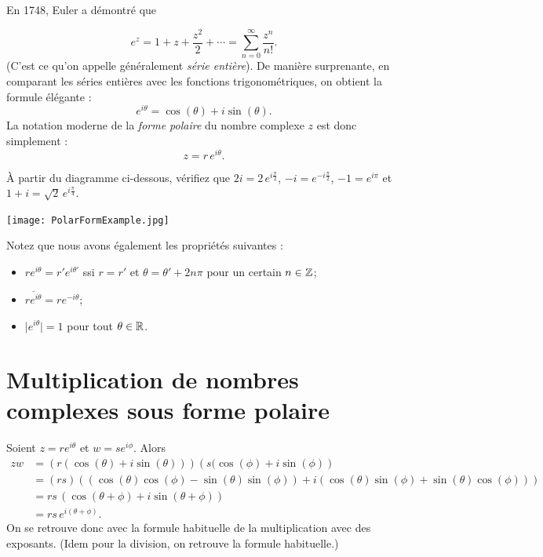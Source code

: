 En 1748, Euler a démontré que

$$
e^z = 1 + z + \frac{z^2}{2} + \cdots = \sum_{n=0}^\infty \frac{z^n}{n!}.
$$
(C'est ce qu'on appelle généralement \emph{série entière}). De manière surprenante, en comparant les séries entières avec les fonctions trigonométriques,
on obtient la formule élégante :
$$
e^{i\theta} = \cos(\theta) + i\sin(\theta).
$$
La notation moderne de la \emph{forme polaire} du nombre complexe $z$ est donc simplement :
$$
z = r \,e^{i\theta}.
$$

\begin{myexample} \label{ex: calculer quelques formes polaires}
À partir du diagramme ci-dessous, vérifiez que $2i= 2\,e^{i \frac{\pi}2}$, $-i=e^{-i \frac{\pi}2}$, $-1 = e^{i\pi}$ et
$1+i =\sqrt{2}\,e^{i \frac{\pi}4}$.
\end{myexample}
\begin{center}
\texttt{[image: PolarFormExample.jpg]}~\\[1cm]
\end{center}


Notez que nous avons également les propriétés suivantes :
\begin{itemize}
\item $re^{i\theta} = r' e^{i\theta'}$ ssi $r=r'$ et $\theta = \theta' + 2n\pi$ pour un certain $n\in \mathbb{Z}$;
\item $\overline{re^{i\theta}} = re^{-i\theta}$;
\item $\vert e^{i\theta} \vert = 1$ pour tout $\theta\in\mathbb{R}$.
\end{itemize}

\section{Multiplication de nombres complexes sous forme polaire}

Soient $z = re^{i\theta}$ et $w = se^{i\phi}$. Alors
\begin{align*}
zw &= \left( r(\cos(\theta)+i\sin(\theta)) \right) \left(s (\cos(\phi)+i\sin(\phi)\right) \\
&= (rs)\left( (\cos(\theta)\cos(\phi) - \sin(\theta)\sin(\phi)) + i(\cos(\theta)\sin(\phi) + \sin(\theta)\cos(\phi)) \right)\\
&= rs\,(\cos(\theta + \phi) + i\sin(\theta + \phi))\\
&= rs\,e^{i(\theta+\phi)}.
\end{align*}
On se retrouve donc avec la formule habituelle de la multiplication avec des exposants.  (Idem pour la
division, on retrouve la formule habituelle.)


